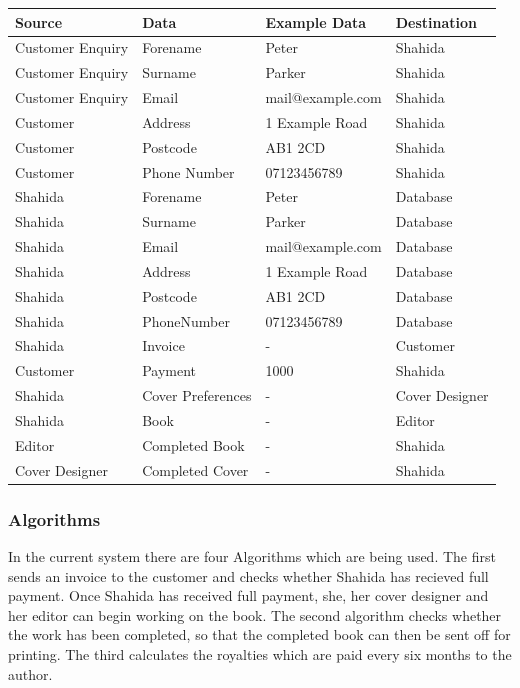 \begin{center}
\begin{tabular}{|p{2.5cm}|p{3.5cm}|p{3.5cm}|p{2.5cm}|}
    \hline
    \textbf{Source} & \textbf{Data} & \textbf{Example Data} & \textbf{Destination} \\ \hline
    Customer Enquiry & Forename & Peter & Shahida  \\ \hline
    Customer Enquiry & Surname & Parker & Shahida  \\ \hline
    Customer Enquiry & Email & mail@example.com & Shahida  \\ \hline
    Customer & Address & 1 Example Road & Shahida  \\ \hline
    Customer & Postcode & AB1 2CD & Shahida  \\ \hline
    Customer & Phone Number & 07123456789 & Shahida  \\ \hline
    Shahida & Forename & Peter & Database  \\ \hline
    Shahida & Surname & Parker & Database  \\ \hline
    Shahida & Email & mail@example.com & Database  \\ \hline
    Shahida & Address & 1 Example Road & Database  \\ \hline
    Shahida & Postcode & AB1 2CD & Database  \\ \hline
    Shahida & PhoneNumber & 07123456789 & Database  \\ \hline
    Shahida & Invoice & - & Customer  \\ \hline
    Customer & Payment & 1000 & Shahida  \\ \hline
    Shahida & Cover Preferences & - & Cover Designer\\ \hline
    Shahida & Book & - & Editor  \\ \hline
    Editor & Completed Book & - & Shahida  \\ \hline
    Cover Designer & Completed Cover & - & Shahida \\ \hline
    \hline
\end{tabular}
\end{center}


\subsubsection{Algorithms}
In the current system there are four Algorithms which are being used. The first sends an invoice to the customer and checks whether Shahida has recieved full payment. Once Shahida has received full payment, she, her cover designer and her editor can begin working on the book. The second algorithm checks whether the work has been completed, so that the completed book can then be sent off for printing. The third calculates the royalties which are paid every six months to the author.

